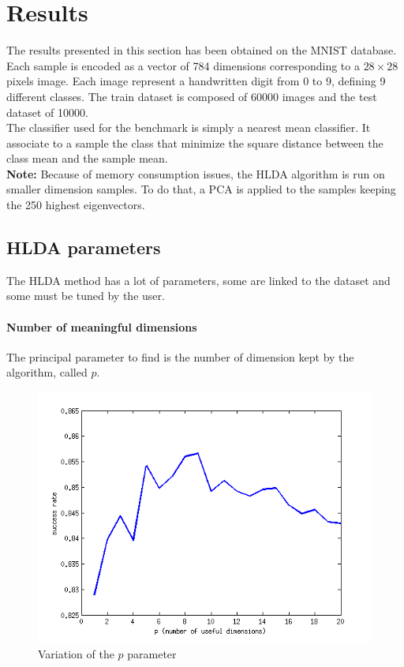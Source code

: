 
\section{Results}
\label{sec:results}

The results presented in this section has been obtained on the MNIST database.
Each sample is encoded as a vector of 784 dimensions corresponding to a $28 \times 28$
pixels image. Each image represent a handwritten digit from 0 to 9, defining 9 different
classes.
The train dataset is composed of 60000 images and the test dataset of 10000.\\

The classifier used for the benchmark is simply a nearest mean classifier.
It associate to a sample the class that minimize the square distance between the class mean and
the sample mean.\\

{\bf Note:} Because of memory consumption issues, the HLDA algorithm is
run on smaller dimension samples. To do that, a PCA is applied to the samples keeping the
250 highest eigenvectors.

\subsection{HLDA parameters}

The HLDA method has a lot of parameters, some are linked to the dataset and some must be tuned
by the user.

\paragraph{Number of meaningful dimensions} The principal parameter to find is the number of dimension kept
by the algorithm, called $p$.

\begin{figure}[H!]
  \includegraphics[scale=0.75]{img/bench-classes}
  \caption{Variation of the $p$ parameter}
  \label{img:classes}
\end{figure}

